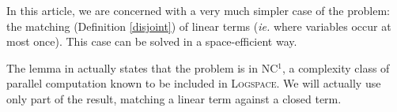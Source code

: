 \smallskip
In this article, we are concerned with a very much simpler case of the problem: the matching (Definition \ref{disjoint}) of linear terms (\textit{ie.} where variables occur at most once).
This case can be solved in a space-efficient way.

\vspace{-2mm}
The lemma in \cite{dwork_parallel_1988} actually states that the problem is in \textsc{NC$^1$}, a complexity class of parallel computation known to be included in \textsc{Logspace}. We will actually use only part of the result, matching a linear term against a closed term.
\vspace{-2mm}
